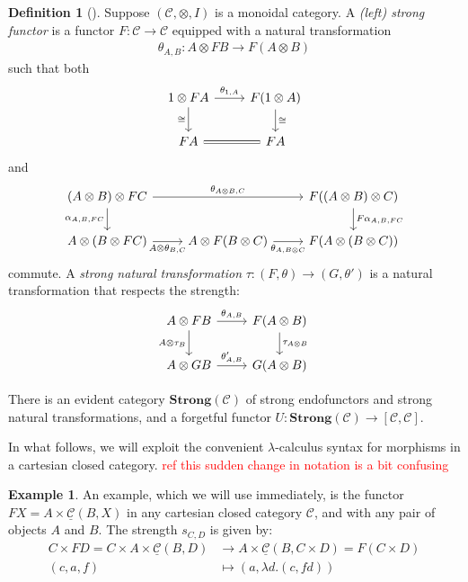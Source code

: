 \documentclass[11pt,a4paper]{article}
\theoremstyle{plain}
\theoremstyle{definition}
\newtheorem{definition}[theorem]{Definition}
\newtheorem{example}[theorem]{Example}
\newcommand{\C}{\mathscr{C}}
\newcommand{\homC}{\underline{\C}}
\newcommand{\Strong}{\mathbf{Strong}}
\newcommand{\todo}[1]{\textcolor{red}{\small #1}}
\begin{document}
\begin{definition}[\cite{StrongFunctors}]
Suppose $(\C, \otimes, I)$ is a monoidal category.  A \emph{(left) strong functor} is a functor $F : \C \to \C$ equipped with a natural transformation
\begin{align*}
\theta_{A,B} : A \otimes F B \to F(A \otimes B)
\end{align*}
such that both
\[
\begin{tikzcd}
1 \otimes F A \ar[r, "\theta_{1,A}"] \ar[d, "\cong" left]  & F(1 \otimes A) \ar[d, "\cong" right] \\
F A \ar[r, equals] & F A
\end{tikzcd}
\]
and
\[
\begin{tikzcd}
(A \otimes B) \otimes F C \ar[rr, "\theta_{A \otimes B, C}"] \ar[d, "\alpha_{A,B,FC}" left]  && F((A \otimes B) \otimes C) \ar[d, "F\alpha_{A,B,FC}" right] \\
A \otimes (B \otimes F C) \ar[r, "A \otimes \theta_{B,C}" below] & A \otimes F(B \otimes C) \ar[r, "\theta_{A, B\otimes C}" below] & F(A \otimes (B \otimes C))
\end{tikzcd}
\]
commute. A \emph{strong natural transformation} $\tau : (F,\theta) \to (G,\theta')$ is a natural transformation that respects the strength:
\[
\begin{tikzcd}
A \otimes F B \ar[r, "\theta_{A,B}"] \ar[d, "A \otimes \tau_B" left]  & F(A \otimes B) \ar[d, "\tau_{A \otimes B}" right] \\
A \otimes G B \ar[r, "\theta'_{A, B}"]& G(A \otimes B)
\end{tikzcd}
\]

There is an evident category $\Strong(\C)$ of strong endofunctors and strong natural transformations, and a forgetful functor $U : \Strong(\C) \to [\C, \C]$.
\end{definition}

In what follows, we will exploit the convenient $\lambda$-calculus syntax for morphisms in a cartesian closed category. \todo{ref} \todo{this sudden change in notation is a bit confusing}

\begin{example}
An example, which we will use immediately, is the functor $FX = A \times \homC(B, X)$ in any cartesian closed category $\C$, and with any pair of objects $A$ and $B$. The strength $s_{C,D}$ is given by:
\begin{align*}
C \times FD = C \times A \times \homC(B, D) &\to A \times \homC(B, C \times D) = F(C \times D)\\
(c, a, f) &\mapsto (a, \lambda d. (c, fd))
\end{align*}
\end{example}
\end{document}
